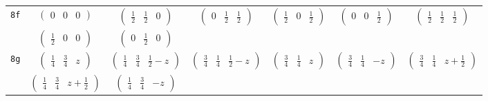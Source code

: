 \documentclass[fleqn,9pt,landscape]{jsarticle}
\begin{document}
\begin{center}
\begin{longtable}{ccccccc}
{\tt 8f} & $ \begin{pmatrix} 0 & 0 & 0 \end{pmatrix} $ & $ \begin{pmatrix} \frac{1}{2} & \frac{1}{2} & 0 \end{pmatrix} $ & $ \begin{pmatrix} 0 & \frac{1}{2} & \frac{1}{2} \end{pmatrix} $ & $ \begin{pmatrix} \frac{1}{2} & 0 & \frac{1}{2} \end{pmatrix} $ & $ \begin{pmatrix} 0 & 0 & \frac{1}{2} \end{pmatrix} $ & $ \begin{pmatrix} \frac{1}{2} & \frac{1}{2} & \frac{1}{2} \end{pmatrix} $ \\
& $ \begin{pmatrix} \frac{1}{2} & 0 & 0 \end{pmatrix} $ & $ \begin{pmatrix} 0 & \frac{1}{2} & 0 \end{pmatrix} $ & $  $ & $  $ & $  $ & $  $ \\ \hline
{\tt 8g} & $ \begin{pmatrix} \frac{1}{4} & \frac{3}{4} & z \end{pmatrix} $ & $ \begin{pmatrix} \frac{1}{4} & \frac{3}{4} & \frac{1}{2} - z \end{pmatrix} $ & $ \begin{pmatrix} \frac{3}{4} & \frac{1}{4} & \frac{1}{2} - z \end{pmatrix} $ & $ \begin{pmatrix} \frac{3}{4} & \frac{1}{4} & z \end{pmatrix} $ & $ \begin{pmatrix} \frac{3}{4} & \frac{1}{4} & - z \end{pmatrix} $ & $ \begin{pmatrix} \frac{3}{4} & \frac{1}{4} & z + \frac{1}{2} \end{pmatrix} $ \\
& $ \begin{pmatrix} \frac{1}{4} & \frac{3}{4} & z + \frac{1}{2} \end{pmatrix} $ & $ \begin{pmatrix} \frac{1}{4} & \frac{3}{4} & - z \end{pmatrix} $ & $  $ & $  $ & $  $ & $  $ \\ \hline

\end{longtable}
\end{center}
\end{document}

